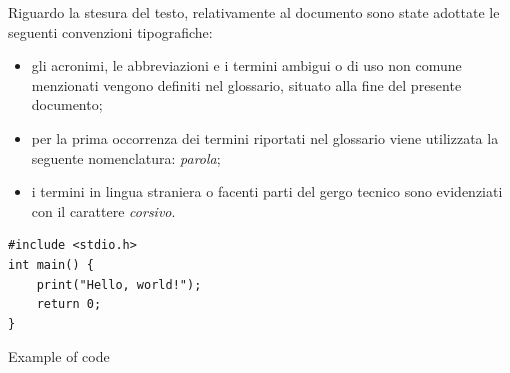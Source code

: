 Riguardo la stesura del testo, relativamente al documento sono state adottate le seguenti convenzioni tipografiche:
\begin{itemize}
	\item gli acronimi, le abbreviazioni e i termini ambigui o di uso non comune menzionati vengono definiti nel glossario, situato alla fine del presente documento;
	\item per la prima occorrenza dei termini riportati nel glossario viene utilizzata la seguente nomenclatura: \textit{parola}\glox\gloxspacing;
	\item i termini in lingua straniera o facenti parti del gergo tecnico sono evidenziati con il carattere \textit{corsivo}.
\end{itemize}

\begin{listing}[H]
\begin{verbatim}
#include <stdio.h>
int main() {
    print("Hello, world!");
    return 0;
}
\end{verbatim}
\caption{Example of code}
\label{listing:a}
\end{listing}

\newpage